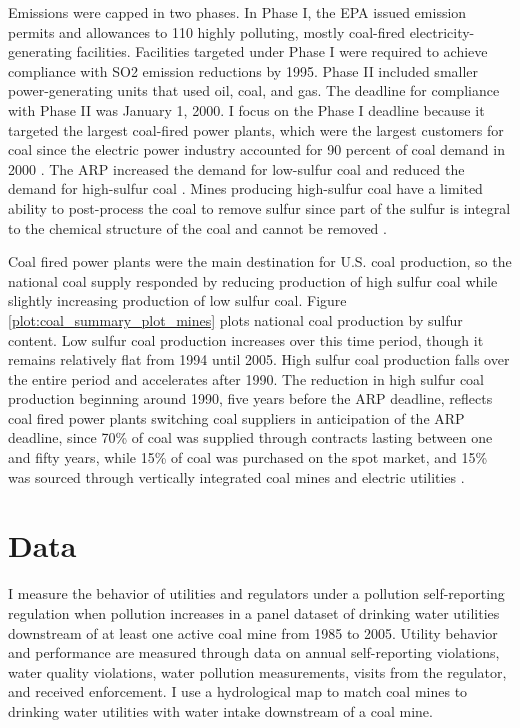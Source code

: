 \documentclass[12pt]{article}
\begin{document}
Emissions were capped in two phases. In Phase I, the EPA issued emission permits and allowances to 110 highly polluting, mostly coal-fired electricity-generating facilities. Facilities targeted under Phase I were required to achieve compliance with SO2 emission reductions by 1995. Phase II included smaller power-generating units that used oil, coal, and gas. The deadline for compliance with Phase II was January 1, 2000. I focus on the Phase I deadline because it targeted the largest coal-fired power plants, which were the largest customers for coal since the electric power industry accounted for 90 percent of coal demand in 2000 \parencite{freme2000us}. The ARP increased the demand for low-sulfur coal and reduced the demand for high-sulfur coal \parencite{epaarpcoalemp, stratford2015coalprod}. Mines producing high-sulfur coal have a limited ability to post-process the coal to remove sulfur since part of the sulfur is integral to the chemical structure of the coal and cannot be removed \parencite{wheelock1984coal}.

Coal fired power plants were the main destination for U.S. coal production, so the national coal supply responded by reducing production of high sulfur coal while slightly increasing production of low sulfur coal. Figure \ref{plot:coal_summary_plot_mines} plots national coal production by sulfur content. Low sulfur coal production increases over this time period, though it remains relatively flat from 1994 until 2005. High sulfur coal production falls over the entire period and accelerates after 1990. The reduction in high sulfur coal production beginning around 1990, five years before the ARP deadline, reflects coal fired power plants switching coal suppliers in anticipation of the ARP deadline, since 70\% of coal was supplied through contracts lasting between one and fifty years, while 15\% of coal was purchased on the spot market, and 15\% was sourced through vertically integrated coal mines and electric utilities \parencite{joskow1987price}. 

\section{Data}\label{sec:data}

I measure the behavior of utilities and regulators under a pollution self-reporting regulation when pollution increases in a panel dataset of drinking water utilities downstream of at least one active coal mine from 1985 to 2005. Utility behavior and performance are measured through data on annual self-reporting violations, water quality violations, water pollution measurements, visits from the regulator, and received enforcement. I use a hydrological map to match coal mines to drinking water utilities with water intake downstream of a coal mine. 
\end{document}
